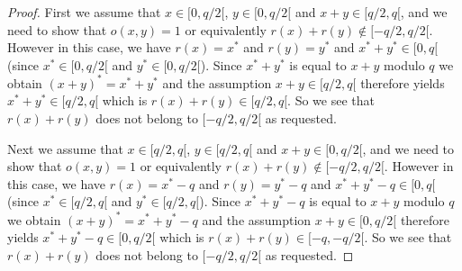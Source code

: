 \documentclass{article}
\begin{document}
\begin{proof}
  First we assume that $x\in[0,q/2[$, $y\in[0,q/2[$ and $x+y\in[q/2,q[$, and 
  we need to show that $o(x,y)=1$ or equivalently $r(x)+r(y)\not\in[-q/2,q/2[$.
  However in this case, we have $r(x)=x^{*}$ and $r(y)=y^{*}$ and 
  $x^{*}+y^{*}\in[0,q[$ (since $x^{*}\in[0,q/2[$ and $y^{*}\in[0,q/2[$).
  Since $x^{*}+y^{*}$ is equal to $x+y$ modulo $q$ we obtain
  $(x+y)^{*}=x^{*}+y^{*}$ and the assumption $x+y\in[q/2,q[$ therefore
  yields $x^{*}+y^{*}\in[q/2,q[$ which is $r(x)+r(y)\in[q/2,q[$. So we see
  that $r(x)+r(y)$ does not belong to $[-q/2,q/2[$ as requested.

  Next we assume that $x\in[q/2,q[$, $y\in[q/2,q[$ and $x+y\in[0,q/2[$,
  and we need to show that $o(x,y)=1$ or equivalently 
  $r(x)+r(y)\not\in[-q/2,q/2[$. However in this case, we have $r(x)=x^{*}-q$
  and $r(y)=y^{*}-q$ and $x^{*}+y^{*}-q\in[0,q[$ (since $x^{*}\in[q/2,q[$
  and $y^{*}\in[q/2,q[$). Since $x^{*}+y^{*}-q$ is equal to $x+y$ modulo $q$
  we obtain $(x+y)^{*}=x^{*}+y^{*}-q$ and the assumption $x+y\in[0,q/2[$
  therefore yields $x^{*}+y^{*}-q\in[0,q/2[$ which is $r(x)+r(y)\in[-q,-q/2[$.
  So we see that $r(x)+r(y)$ does not belong to $[-q/2,q/2[$ as requested.


\end{proof}
\end{document}
